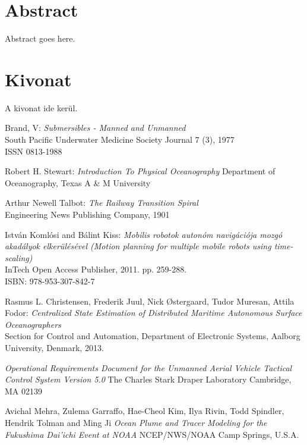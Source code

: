 \documentclass[12pt,a4paper,english,magyar,oneside]{report}
\begin{document}


\chapter*{Abstract}

Abstract goes here.


\chapter*{Kivonat}

A kivonat ide kerül.

\setcounter{tocdepth}{2} %
\tableofcontents %







\begin{thebibliography}{9}

  Brand, V:
  \emph{Submersibles - Manned and Unmanned}\\
  South Pacific Underwater Medicine Society Journal 7 (3), 1977\\
  ISSN 0813-1988
  
  Robert H. Stewart:
  \emph{Introduction To Physical Oceanography}
  Department of Oceanography, Texas A \& M University

  Arthur Newell Talbot:
  \emph{The Railway Transition Spiral}\\
  Engineering News Publishing Company, 1901

  Istv\'an Koml\'osi and B\'alint Kiss:
  \emph{Mobilis robotok auton\'om navig\'aci\'oja mozg\'o akad\'alyok elker\"ul\'es\'evel (Motion planning for multiple mobile robots using time-scaling)}\\
  InTech Open Access Publisher, 2011. pp. 259-288.\\
  ISBN: 978-953-307-842-7
  
	Rasmus L. Christensen, Frederik Juul, Nick \O stergaard, Tudor Muresan, Attila Fodor:
	\emph{Centralized State Estimation of Distributed Maritime Autonomous Surface Oceanographers}\\
	Section for Control and Automation, Department of Electronic Systems, Aalborg University, Denmark, 2013.
	
	
	\emph{Operational Requirements Document for the Unmanned Aerial Vehicle Tactical Control System Version 5.0}
	The Charles Stark Draper Laboratory Cambridge, MA 02139
	
	Avichal Mehra, Zulema Garraffo, Hae-Cheol Kim, Ilya Rivin, Todd Spindler, Hendrik Tolman and Ming Ji
	\emph{Ocean Plume and Tracer Modeling for the Fukushima Dai'ichi Event at NOAA}
	NCEP/NWS/NOAA Camp Springs, U.S.A.

\end{thebibliography}
\end{document}
